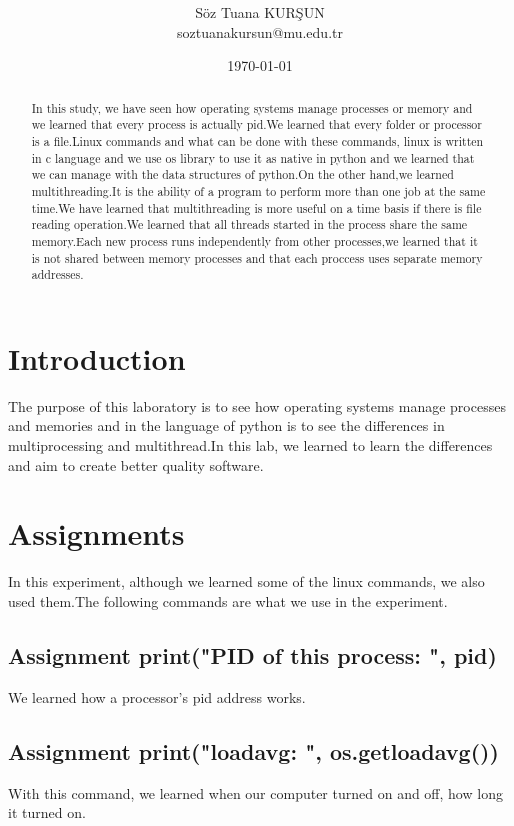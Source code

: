 \documentclass[onecolumn]{article}
\title{\spacecaps{Assignment Report 1: Process and Thread Implementation}\\ \normalsize \spacesc{CENG2034, Operating Systems} }
\author{Söz Tuana KURŞUN\\soztuanakursun@mu.edu.tr}
\date{\today}
\begin{document}
\maketitle

\begin{abstract}
In this study, we have seen how operating systems manage processes or memory and we learned that every process is actually pid.We learned that every folder or processor is a file.Linux commands and what can be done with these commands, linux is written in c language and we use os library to use it as native in python and we learned that we can manage with the data structures of python.On the other hand,we learned multithreading.It is the ability of a program to perform more than one job at the same time.We have learned that multithreading is more useful on a time basis if there is file reading operation.We learned that all threads started in the process share the same memory.Each new process runs independently from other processes,we learned that it is not shared between memory processes and that each proccess uses separate memory addresses.
\end{abstract}

\section{Introduction}

The purpose of this laboratory is to see how operating systems manage processes and memories and in the language of python is to see the differences in multiprocessing and multithread.In this lab, we learned to learn the differences and aim to create better quality software.


\section{Assignments}
In this experiment, although we learned some of the linux commands, we also used them.The following commands are what we use in the experiment.

\subsection{Assignment print("PID of this process: ", pid)}
We learned how a processor's pid address works.
\subsection{Assignment print("loadavg: ", os.getloadavg())}
With this command, we learned when our computer turned on and off, how long it turned on.
\end{document}
